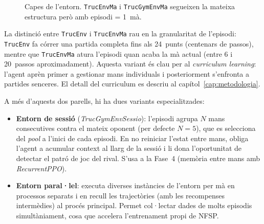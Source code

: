 \begin{figure}[H]
  \centering
  \caption{Capes de l'entorn. \texttt{TrucEnvMa} i \texttt{TrucGymEnvMa} segueixen
           la mateixa estructura però amb episodi = 1~mà.}
  \label{fig:capes-entorn}
\end{figure}

La distinció entre \texttt{TrucEnv} i \texttt{TrucEnvMa} rau en la granularitat de
l'episodi: \texttt{TrucEnv} fa córrer una partida completa fins als 24~punts (centenars
de passos), mentre que \texttt{TrucEnvMa} atura l'episodi quan acaba la mà actual
(entre 6 i 20~passos aproximadament). Aquesta variant és clau per al
\emph{curriculum learning}: l'agent aprèn primer a gestionar mans individuals i
posteriorment s'enfronta a partides senceres. El detall del curriculum es descriu
al capítol~\ref{cap:metodologia}.

A més d'aquests dos parells, hi ha dues variants especialitzades:

\begin{itemize}
  \item \textbf{Entorn de sessió} (\emph{TrucGymEnvSessio}): l'episodi agrupa $N$
        mans consecutives contra el mateix oponent (per defecte $N=5$), que es
        selecciona del \emph{pool} a l'inici de cada episodi. En no reiniciar l'estat
        entre mans, obliga l'agent a acumular context al llarg de la sessió i li dona
        l'oportunitat de detectar el patró de joc del rival. S'usa a la Fase~4
        (memòria entre mans amb \emph{RecurrentPPO}).

  \item \textbf{Entorn paral·lel}: executa diverses instàncies de l'entorn per mà en
        processos separats i en recull les trajectòries (amb les recompenses
        intermèdies) al procés principal. Permet col·lectar dades de molts episodis
        simultàniament, cosa que accelera l'entrenament propi de \ac{NFSP}.
\end{itemize}

